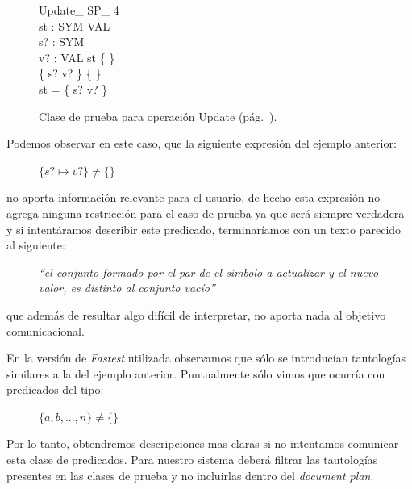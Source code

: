 \begin{figure}[H]
  \centering
  \begin{schema}{Update\_ SP\_ 4}\\
   st : SYM \pfun VAL \\
   s? : SYM \\
   v? : VAL 
  \where
   st \neq \{ \} \\
   \{ s? \mapsto v? \} \neq \{ \} \\
   \dom st = \dom \{ s? \mapsto v? \}
  \end{schema}
  \caption{Clase de prueba para operación Update (pág.~\pageref{fig:spec_symbol_table}).}
  \label{fig:ej_update_sp_4}
\end{figure}

Podemos observar en este caso, que la siguiente expresión del ejemplo anterior:

\begin{figure}[H]
  \centering
  $\{ s? \mapsto v? \} \neq \{ \}$ 
\end{figure}

\noindent
no aporta información relevante para el usuario, de hecho esta expresión no agrega ninguna restricción para el caso de prueba ya que será siempre verdadera y si intentáramos describir este predicado, terminaríamos con un texto parecido al siguiente:

\begin{figure}[H]
  \centering
  \emph{``el conjunto formado por el par de el símbolo a actualizar y el nuevo valor, es distinto al conjunto vacío''}
\end{figure}

\noindent
que además de resultar algo difícil de interpretar, no aporta nada al objetivo comunicacional.

En la versión de \emph{Fastest} utilizada observamos que sólo se introducían tautologías similares a la del ejemplo anterior. Puntualmente sólo vimos que ocurría con predicados del tipo:

\begin{figure}[H]
  \centering
  $\{ a, b, ... , n \} \neq \{ \}$ 
\end{figure}



Por lo tanto, obtendremos descripciones mas claras si no intentamos comunicar esta clase de predicados. Para nuestro sistema deberá filtrar las tautologías presentes en las clases de prueba y no incluirlas dentro del \emph{document plan}.




